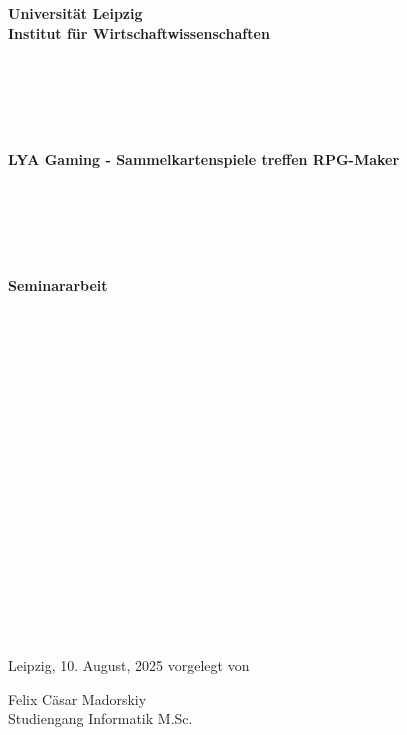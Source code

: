 \documentclass[fontsize=11, a4aper]{scrartcl}
\begin{document}
	
	
	

\begin{center}
	
	\fontsize{14pt}{12pt}
	
	\textbf{Universität Leipzig}\\
	\textbf{Institut für Wirtschaftwissenschaften}\\
	
\end{center}

\begin{verbatim}
	
	
	
	
\end{verbatim}

\begin{center}
	
	\fontsize{14pt}{12pt}
	
	\textbf{LYA Gaming - Sammelkartenspiele treffen RPG-Maker}
	
\end{center}

\begin{verbatim}
	
	
	
	
\end{verbatim}

\begin{center}
	
	\fontsize{18pt}{12pt}
	
	\textbf{Seminararbeit}
	
\end{center}

\begin{verbatim}
	
	
	
	
	
	
	
	
	
	
	
	
	
	
	
	
	
\end{verbatim}

\begin{flushright}
	
	Leipzig, 10. August, 2025 \hfill vorgelegt von\\
	
	\bigskip
	
	Felix Cäsar Madorskiy\\
	Studiengang Informatik M.Sc.
	
\end{flushright}
\end{document}
